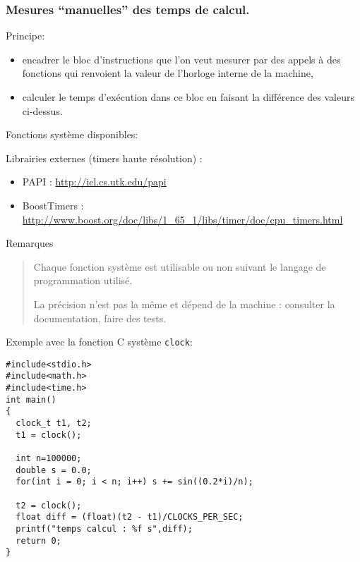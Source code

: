 \documentclass{beamer}
\begin{document}
\begin{frame}[fragile]
\frametitle{Mesures ``manuelles'' des temps de calcul.}

Principe: 
\begin{itemize}
	\item encadrer le bloc d'instructions que l'on veut mesurer par des appels \`a des fonctions qui renvoient la valeur de l'horloge interne de la machine,
	\item calculer le temps d'ex\'ecution dans ce bloc en faisant la diff\'erence des valeurs ci-dessus.
\end{itemize}
\vfill

Fonctions syst\`eme disponibles:
\vfill
\end{frame}


\begin{frame}
Librairies externes (timers haute r\'esolution) :
\begin{itemize}
	\item PAPI : \url{http://icl.cs.utk.edu/papi}
	\item BoostTimers : \url{http://www.boost.org/doc/libs/1_65_1/libs/timer/doc/cpu_timers.html}
\end{itemize}
\vfill

Remarques
\begin{quote}
	Chaque fonction syst\`eme est utilisable ou non suivant le langage de programmation utilis\'e.
	
	La pr\'ecision n'est pas la m\^eme et d\'epend de la machine : consulter la documentation, faire des tests.
\end{quote}
\vfill
\end{frame}


\begin{frame}[fragile]

Exemple avec la fonction C syst\`eme {\tt clock}:

\vfill
\begin{lstlisting}
#include<stdio.h>   
#include<math.h>   
#include<time.h>   
int main()   
{   
  clock_t t1, t2;
  t1 = clock();   
	
  int n=100000;
  double s = 0.0;
  for(int i = 0; i < n; i++) s += sin((0.2*i)/n);  
	
  t2 = clock();   
  float diff = (float)(t2 - t1)/CLOCKS_PER_SEC;   
  printf("temps calcul : %f s",diff);   
  return 0;   
}
\end{lstlisting}

\end{frame}
\end{document}
